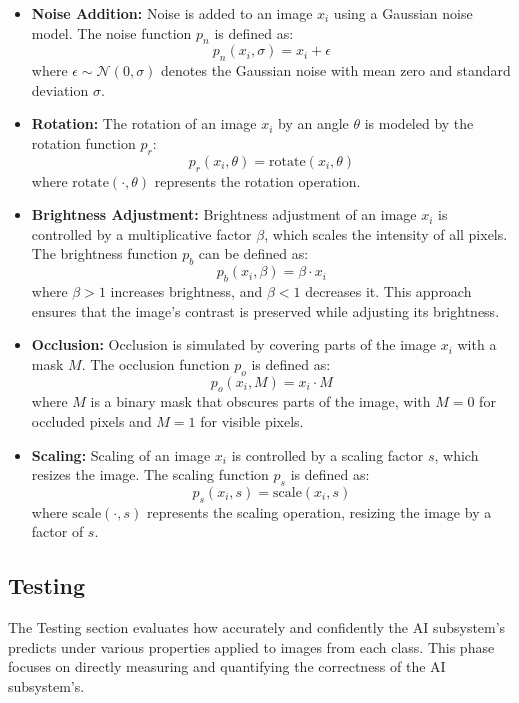 \documentclass[10pt, conference, a4paper, final]{IEEEtran}
\begin{document}
\begin{itemize}
    \item \textbf{Noise Addition:} Noise is added to an image \( x_i \) using a Gaussian noise model. The noise function \( p_n \) is defined as:
    \[ p_n(x_i, \sigma) = x_i + \epsilon \]
    where \( \epsilon \sim \mathcal{N}(0, \sigma) \) denotes the Gaussian noise with mean zero and standard deviation \(\sigma\).

    \item \textbf{Rotation:} The rotation of an image \( x_i \) by an angle \(\theta\) is modeled by the rotation function \( p_r \):
    \[ p_r(x_i, \theta) = \text{rotate}(x_i, \theta) \]
    where \(\text{rotate}(\cdot, \theta)\) represents the rotation operation.

    \item \textbf{Brightness Adjustment:} Brightness adjustment of an image \( x_i \) is controlled by a multiplicative factor \( \beta \), which scales the intensity of all pixels. The brightness function \( p_b \) can be defined as:
    \[ p_b(x_i, \beta) = \beta \cdot x_i \]
    where \( \beta > 1 \) increases brightness, and \( \beta < 1 \) decreases it. This approach ensures that the image's contrast is preserved while adjusting its brightness.

    \item \textbf{Occlusion:} Occlusion is simulated by covering parts of the image \( x_i \) with a mask \( M \). The occlusion function \( p_o \) is defined as:
    \[ p_o(x_i, M) = x_i \cdot M \]
    where \( M \) is a binary mask that obscures parts of the image, with \( M = 0 \) for occluded pixels and \( M = 1 \) for visible pixels.

    \item \textbf{Scaling:} Scaling of an image \( x_i \) is controlled by a scaling factor \( s \), which resizes the image. The scaling function \( p_s \) is defined as:
    \[ p_s(x_i, s) = \text{scale}(x_i, s) \]
    where \(\text{scale}(\cdot, s)\) represents the scaling operation, resizing the image by a factor of \( s \).
\end{itemize}


\subsection{Testing }

The Testing section evaluates how accurately and confidently the  AI subsystem's predicts under various properties applied to images from each class. This phase focuses on directly measuring and quantifying the correctness of the  AI subsystem's.
\end{document}

